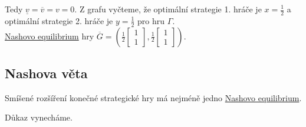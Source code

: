 Tedy $\underline{v} = \overline{v} = v = 0$. Z grafu vyčteme, že optimální strategie 1. hráče je $x=\frac{1}{2}$ a 
optimální strategie 2. hráče je $y = \frac{1}{2}$ pro hru $\Gamma$.\\
\hyperref[nash]{Nashovo equilibrium} hry $\overline{G} = 
\left(\frac{1}{2}\begin{bmatrix}1 \\ 1\end{bmatrix}, \frac{1}{2}\begin{bmatrix}1 \\ 1\end{bmatrix}\right)$.

\subsection{Nashova věta}
Smíšené rozšíření konečné strategické hry má nejméně jedno \hyperref[nash]{Nashovo equilibrium}.

Důkaz vynecháme.